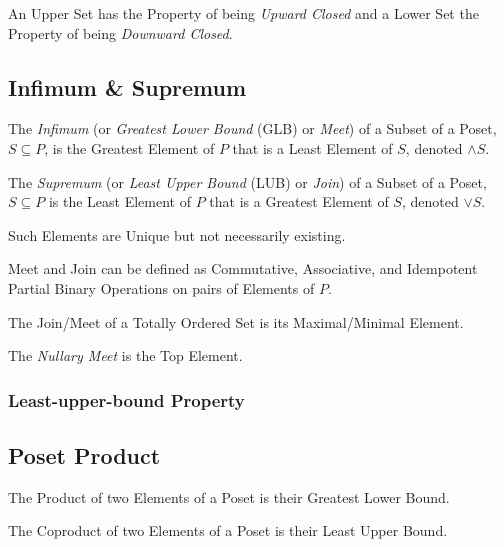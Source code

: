 An Upper Set has the Property of being \emph{Upward Closed} and a
Lower Set the Property of being \emph{Downward Closed}.



\subsection{Infimum \& Supremum}\label{sec:glb_lub}

The \emph{Infimum} (or \emph{Greatest Lower Bound} (GLB) or
\emph{Meet}) of a Subset of a Poset, $S \subseteq P$, is the Greatest
Element of $P$ that is a Least Element of $S$, denoted $\wedge S$.

The \emph{Supremum} (or \emph{Least Upper Bound} (LUB) or \emph{Join})
of a Subset of a Poset, $S \subseteq P$ is the Least Element of $P$
that is a Greatest Element of $S$, denoted $\vee S$.

Such Elements are Unique but not necessarily existing.

Meet and Join can be defined as Commutative, Associative, and
Idempotent Partial Binary Operations on pairs of Elements of $P$.

The Join/Meet of a Totally Ordered Set is its Maximal/Minimal Element.

The \emph{Nullary Meet} is the Top Element.



\subsubsection{Least-upper-bound Property}\label{sec:leastupperbound_property}



\subsection{Poset Product}\label{sec:poset_product}

The Product of two Elements of a Poset is their Greatest Lower Bound.

The Coproduct of two Elements of a Poset is their Least Upper Bound.



